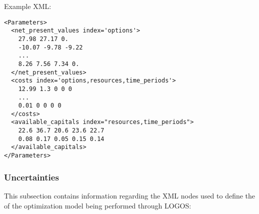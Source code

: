 Example XML:
\begin{lstlisting}[style=XML]
<Parameters>
  <net_present_values index='options'>
    27.98 27.17 0.
    -10.07 -9.78 -9.22
    ...
    8.26 7.56 7.34 0.
  </net_present_values>
  <costs index='options,resources,time_periods'>
    12.99 1.3 0 0 0
    ...
    0.01 0 0 0 0
  </costs>
  <available_capitals index="resources,time_periods">
    22.6 36.7 20.6 23.6 22.7
    0.08 0.17 0.05 0.15 0.14
  </available_capitals>
</Parameters>
\end{lstlisting}

%
\subsubsection{Uncertainties}
\label{subsubsec:Uncertainties}
This subsection contains information regarding the XML nodes used to define the
 of the optimization model being performed through LOGOS:
